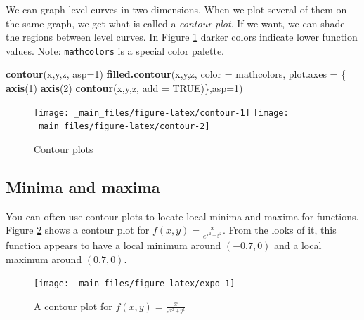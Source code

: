 \documentclass[
]{book}
\newenvironment{Shaded}{\begin{snugshade}}{\end{snugshade}}
\newcommand{\AttributeTok}[1]{\textcolor[rgb]{0.13,0.29,0.53}{#1}}
\newcommand{\ConstantTok}[1]{\textcolor[rgb]{0.56,0.35,0.01}{#1}}
\newcommand{\DecValTok}[1]{\textcolor[rgb]{0.00,0.00,0.81}{#1}}
\newcommand{\FunctionTok}[1]{\textcolor[rgb]{0.13,0.29,0.53}{\textbf{#1}}}
\newcommand{\NormalTok}[1]{#1}
\theoremstyle{definition}
\theoremstyle{definition}
\theoremstyle{definition}
\theoremstyle{definition}
\theoremstyle{remark}
\begin{document}
We can graph level curves in two dimensions. When we plot several of them on the same graph, we get what is called a \emph{contour plot}. If we want, we can shade the regions between level curves. In Figure \ref{fig:contour} darker colors indicate lower function values. Note: \texttt{mathcolors} is a special color palette.

\begin{Shaded}
\begin{Highlighting}[]
\FunctionTok{contour}\NormalTok{(x,y,z, }\AttributeTok{asp=}\DecValTok{1}\NormalTok{)}
\FunctionTok{filled.contour}\NormalTok{(x,y,z,  }
                \AttributeTok{color =}\NormalTok{ mathcolors,  }
            \AttributeTok{plot.axes =}\NormalTok{ \{}
               \FunctionTok{axis}\NormalTok{(}\DecValTok{1}\NormalTok{)}
               \FunctionTok{axis}\NormalTok{(}\DecValTok{2}\NormalTok{)}
               \FunctionTok{contour}\NormalTok{(x,y,z,}
                    \AttributeTok{add =} \ConstantTok{TRUE}\NormalTok{)\},}\AttributeTok{asp=}\DecValTok{1}\NormalTok{)}
\end{Highlighting}
\end{Shaded}

\begin{figure}

{\centering \texttt{[image: \_main\_files/figure-latex/contour-1]} \texttt{[image: \_main\_files/figure-latex/contour-2]} 

}

\caption{Contour plots}\label{fig:contour}
\end{figure}

\subsection*{Minima and maxima}\label{minima-and-maxima}

You can often use contour plots to locate local minima and maxima for functions. Figure \ref{fig:expo} shows a contour plot for \(f(x,y)=\frac{x}{e^{x^2+y^2}}.\) From the looks of it, this function appears to have a local minimum around \((-0.7,0)\) and a local maximum around \((0.7,0)\).

\begin{figure}

{\centering \texttt{[image: \_main\_files/figure-latex/expo-1]} 

}

\caption{A contour plot for $f(x,y)=\frac{x}{e^{x^2+y^2}}$}\label{fig:expo}
\end{figure}
\end{document}
